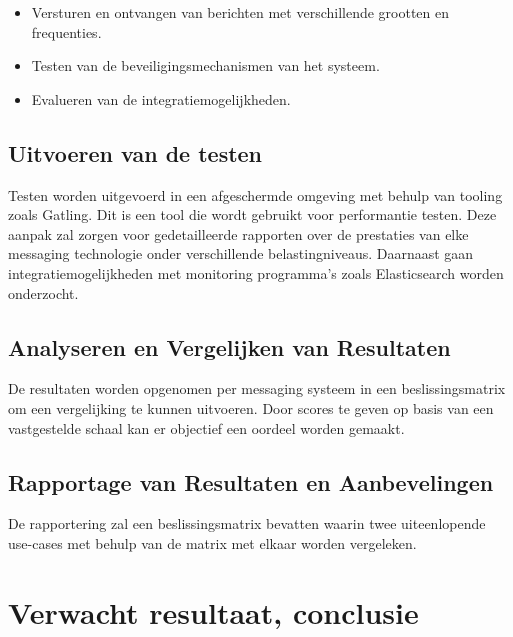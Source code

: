 \begin{itemize}
  \item Versturen en ontvangen van berichten met verschillende grootten en frequenties.
  \item Testen van de beveiligingsmechanismen van het systeem.
  \item Evalueren van de integratiemogelijkheden.
 \end{itemize}

\subsection{Uitvoeren van de testen}
Testen worden uitgevoerd in een afgeschermde omgeving met behulp van tooling zoals Gatling.
Dit is een tool die wordt gebruikt voor performantie testen.
Deze aanpak zal zorgen voor gedetailleerde rapporten over de prestaties van elke messaging technologie onder verschillende belastingniveaus. 
Daarnaast gaan integratiemogelijkheden met monitoring programma's zoals Elasticsearch worden onderzocht.

\subsection{Analyseren en Vergelijken van Resultaten}
De resultaten worden opgenomen per messaging systeem in een beslissingsmatrix om een vergelijking te kunnen uitvoeren. 
Door scores te geven op basis van een vastgestelde schaal kan er objectief een oordeel worden gemaakt.

\subsection{Rapportage van Resultaten en Aanbevelingen}
De rapportering zal een beslissingsmatrix bevatten waarin twee uiteenlopende use-cases met behulp van de 
matrix met elkaar worden vergeleken.

\section{Verwacht resultaat, conclusie}%

\label{sec:verwachte-resultaten}


